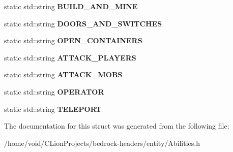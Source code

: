\begin{DoxyCompactItemize}
\mbox{\label{struct_abilities_ab4e4758ccf75cccdbfb585599658bc27}} 
static std\+::string {\bfseries B\+U\+I\+L\+D\+\_\+\+A\+N\+D\+\_\+\+M\+I\+NE}
\item 
\mbox{\label{struct_abilities_a38b2df2eb1c5a2816c57f622a2e8e2a1}} 
static std\+::string {\bfseries D\+O\+O\+R\+S\+\_\+\+A\+N\+D\+\_\+\+S\+W\+I\+T\+C\+H\+ES}
\item 
\mbox{\label{struct_abilities_ad16b9ee497a3316ef5b2136839e40620}} 
static std\+::string {\bfseries O\+P\+E\+N\+\_\+\+C\+O\+N\+T\+A\+I\+N\+E\+RS}
\item 
\mbox{\label{struct_abilities_a280502d5a4885ce64dd736f1a7ee7c7a}} 
static std\+::string {\bfseries A\+T\+T\+A\+C\+K\+\_\+\+P\+L\+A\+Y\+E\+RS}
\item 
\mbox{\label{struct_abilities_ab92a23a2b792332bfa229fc09f4dea54}} 
static std\+::string {\bfseries A\+T\+T\+A\+C\+K\+\_\+\+M\+O\+BS}
\item 
\mbox{\label{struct_abilities_a2e6beeb743b4b7bcb452ea1ae2ca894a}} 
static std\+::string {\bfseries O\+P\+E\+R\+A\+T\+OR}
\item 
\mbox{\label{struct_abilities_ac38643f2a39430be68b6151db1f33a18}} 
static std\+::string {\bfseries T\+E\+L\+E\+P\+O\+RT}
\end{DoxyCompactItemize}


The documentation for this struct was generated from the following file\+:\begin{DoxyCompactItemize}
\item 
/home/void/\+C\+Lion\+Projects/bedrock-\/headers/entity/Abilities.\+h\end{DoxyCompactItemize}

